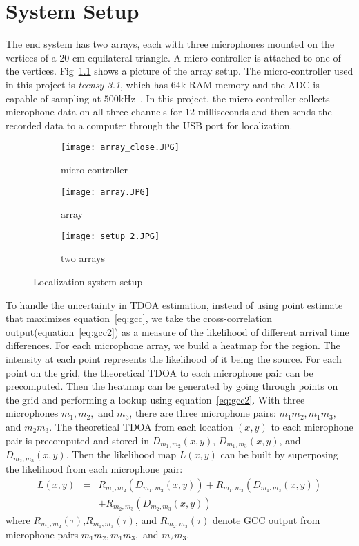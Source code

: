\chapter{System Setup}
The end system has two arrays, each with three microphones mounted on the vertices of a $20$ cm equilateral triangle. A micro-controller is attached to one of the vertices. Fig~\ref{fig:setup_array} shows a picture of the array setup. The micro-controller used in this project is \emph{teensy 3.1}, which has $64$k RAM memory and the ADC is capable of sampling at $500$kHz~\cite{tdoa:micloc, sys:teensy}. In this project, the micro-controller collects microphone data on all three channels for $12$ milliseconds and then sends the recorded data to a computer through the USB port for localization. 

\begin{figure}[]
  \centering
  \begin{subfigure}[]{.33\textwidth}
    \texttt{[image: array\_close.JPG]}
    \caption{micro-controller}
  \end{subfigure}
  \begin{subfigure}[]{.33\textwidth}
    \texttt{[image: array.JPG]}
    \caption{array}
  \end{subfigure}
  \begin{subfigure}[]{.33\textwidth}
    \texttt{[image: setup\_2.JPG]}
    \caption{two arrays}
  \end{subfigure}
  \caption{Localization system setup}
  \label{fig:setup_array}
\end{figure}

To handle the uncertainty in TDOA estimation, instead of using point estimate that maximizes equation~\ref{eq:gcc}, we take the cross-correlation output(equation~\ref{eq:gcc2}) as a measure of the likelihood of different arrival time differences. For each microphone array, we build a heatmap for the region. The intensity at each point represents the likelihood of it being the source. For each point on the grid, the theoretical TDOA to each microphone pair can be precomputed. Then the heatmap can be generated by going through points on the grid and performing a lookup using equation~\ref{eq:gcc2}. With three microphones $m_1,m_2,$ and $m_3$, there are three microphone pairs: $m_1m_2,m_1m_3,$ and $m_2m_3$. The theoretical TDOA from each location $(x,y)$ to each microphone pair is precomputed and stored in $D_{m_1,m_2}(x,y)$, $D_{m_1,m_3}(x,y)$, and $D_{m_2,m_3}(x,y)$. Then the likelihood map $L(x,y)$ can be built by superposing the likelihood from each microphone pair:
\begin{eqnarray*}
L(x,y) &=& R_{m_1,m_2}(D_{m_1,m_2}(x,y)) + R_{m_1,m_3}(D_{m_1,m_3}(x,y)) \\
 & & +R_{m_2,m_3}(D_{m_2,m_3}(x,y)) 
\end{eqnarray*}
where $R_{m_1,m_2}(\tau)$,$R_{m_1,m_3}(\tau)$, and $R_{m_2,m_3}(\tau)$ denote GCC output from microphone pairs $m_1m_2,m_1m_3,$ and $m_2m_3$.

